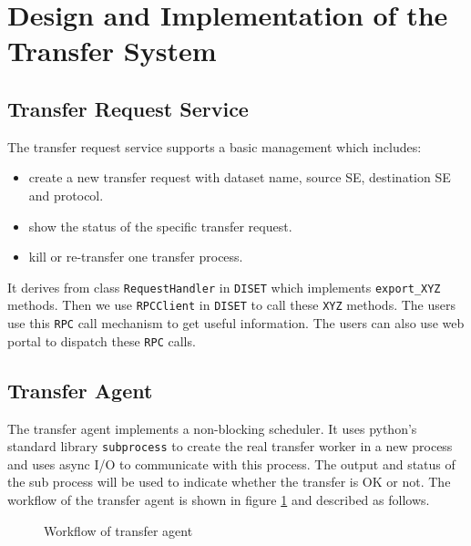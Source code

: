 \section{Design and Implementation of the Transfer System}

\subsection{Transfer Request Service}

The transfer request service supports a basic management which includes:
\begin{itemize}
    \item create a new transfer request with dataset name,
          source SE, destination SE and protocol.
    \item show the status of the specific transfer request.
    \item kill or re-transfer one transfer process.
\end{itemize}
It derives from class {\tt RequestHandler} in {\tt DISET}
which implements \verb"export_XYZ" methods.
Then we use {\tt RPCClient} in {\tt DISET} to call these \verb"XYZ"
methods. The users use this {\tt RPC} call mechanism to get useful
information. The users can also use web portal to dispatch these
{\tt RPC} calls.
%
\subsection{Transfer Agent}
%
The transfer agent implements a non-blocking scheduler.
It uses python's standard library {\tt subprocess} to 
create the real transfer worker in a new process
and uses async I/O to communicate with this process.
The output and status of the sub process will be used 
to indicate whether the transfer is OK or not.
%
The workflow of the transfer agent is shown in figure \ref{fig:agent}
and described as follows.
\begin{figure}[htbp]
    
    \caption{Workflow of transfer agent} \label{fig:agent}
\end{figure}

